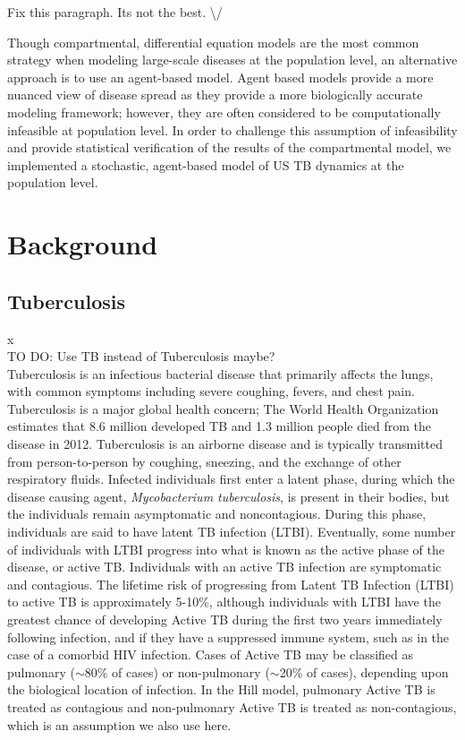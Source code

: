 \documentclass{amsart}
\newcommand{\TODO}[1]{\hfill\\{\huge \color{red} TO DO:} #1 \hfill \\}
\begin{document}
{\huge \color{red} Fix this paragraph. Its not the best. \textbackslash/}

Though compartmental, differential equation models are the most common strategy
when modeling large-scale diseases at the population level, an alternative
approach is to use an agent-based model. Agent
based models provide a more nuanced view of disease spread as they provide a
more biologically accurate modeling framework; however, they are often
considered to be computationally infeasible at population level. In order to
challenge this assumption of infeasibility and provide statistical verification
of the results of the compartmental model, we implemented a stochastic,
agent-based model of US TB dynamics at the population level.

\section{Background}
\subsection{Tuberculosis} x 
\TODO{Use TB instead of Tuberculosis maybe?}
Tuberculosis is an infectious bacterial disease that primarily affects the lungs,
with common symptoms including severe coughing, fevers, and chest pain.
Tuberculosis is a major global health concern; The World Health Organization
estimates that 8.6 million developed TB and 1.3 million people died from
the disease in 2012. Tuberculosis is an airborne disease and is typically
transmitted from person-to-person by coughing, sneezing, and the exchange of
other respiratory fluids.  Infected individuals first enter a latent phase,
during which the disease causing agent, \emph{Mycobacterium tuberculosis}, is
present in their bodies, but the individuals remain asymptomatic and
noncontagious. During this phase, individuals are said to have latent TB
infection (LTBI). Eventually, some number of individuals with LTBI progress into
what is known as the active phase of the disease, or active TB. Individuals with
an active TB infection are symptomatic and contagious. The lifetime risk of
progressing from Latent TB Infection (LTBI) to active TB is approximately
5-10\%, although individuals with LTBI have the greatest chance of developing
Active TB during the first two years immediately following infection, and if
they have a suppressed immune system, such as in the case of a comorbid HIV
infection. Cases of Active TB may be classified as pulmonary ($\sim$80\% of
cases) or non-pulmonary ($\sim$20\% of cases), depending upon the biological
location of infection. In the Hill model, pulmonary Active TB is treated as
contagious and non-pulmonary Active TB is treated as non-contagious, which is an
assumption we also use here.
\end{document}
